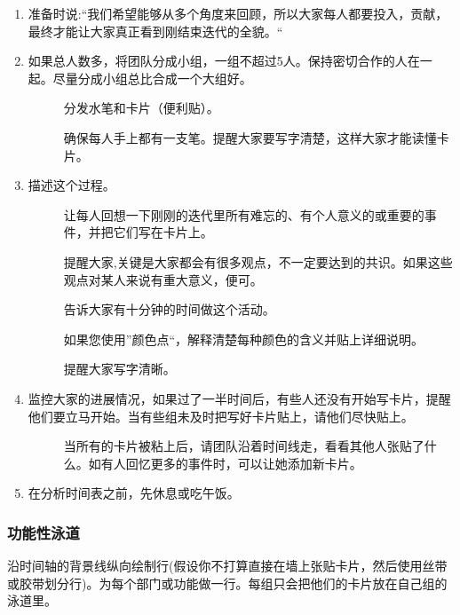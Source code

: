 \begin{enumerate}
\tightlist
\item
  准备时说:``我们希望能够从多个角度来回顾，所以大家每人都要投入，贡献，最终才能让大家真正看到刚结束迭代的全貌。``
\item
  如果总人数多，将团队分成小组，一组不超过5人。保持密切合作的人在一起。尽量分成小组总比合成一个大组好。

  \begin{description}
  \item[]
  分发水笔和卡片（便利贴）。

  确保每人手上都有一支笔。提醒大家要写字清楚，这样大家才能读懂卡片。
  \end{description}
\item
  描述这个过程。

  \begin{description}
  \item[]
  让每人回想一下刚刚的迭代里所有难忘的、有个人意义的或重要的事件，并把它们写在卡片上。

  提醒大家,关键是大家都会有很多观点，不一定要达到的共识。如果这些观点对某人来说有重大意义，便可。

  告诉大家有十分钟的时间做这个活动。

  如果您使用''颜色点``，解释清楚每种颜色的含义并贴上详细说明。

  提醒大家写字清晰。
  \end{description}
\item
  监控大家的进展情况，如果过了一半时间后，有些人还没有开始写卡片，提醒他们要立马开始。当有些组未及时把写好卡片贴上，请他们尽快贴上。

  \begin{description}
  \item[]
  当所有的卡片被粘上后，请团队沿着时间线走，看看其他人张贴了什么。如有人回忆更多的事件时，可以让她添加新卡片。
  \end{description}
\item
  在分析时间表之前，先休息或吃午饭。
\end{enumerate}

\hypertarget{ux529fux80fdux6027ux6cf3ux9053}{%
\subsubsection{功能性泳道}\label{ux529fux80fdux6027ux6cf3ux9053}}

沿时间轴的背景线纵向绘制行(假设你不打算直接在墙上张贴卡片，然后使用丝带或胶带划分行)。为每个部门或功能做一行。每组只会把他们的卡片放在自己组的泳道里。

